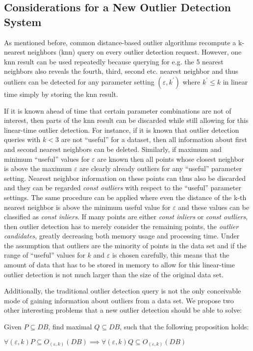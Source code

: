 \documentclass[runningheads]{llncs}
\begin{document}
\subsection{Considerations for a New Outlier Detection System}
As mentioned before, common distance-based outlier algorithms recompute a k-nearest neighbors (knn) query on every outlier detection request. However, one knn result can be used repeatedly because querying for e.g. the 5 nearest neighbors also reveals the fourth, third, second etc. nearest neighbor and thus outliers can be detected for any parameter setting $(\varepsilon,k^\prime)$ where $k^\prime \leq k$ in linear time simply by storing the knn result.

If it is known ahead of time that certain parameter combinations are not of interest, then parts of the knn result can be discarded while still allowing for this linear-time outlier detection. For instance, if it is known that outlier detection queries with $k < 3$ are not ``useful'' for a dataset, then all information about first and second nearest neighbors can be deleted. Similarly, if maximum and minimum ``useful'' values for $\varepsilon$ are known then all points whose closest neighbor is above the maximum $\varepsilon$ are clearly already outliers for any ``useful'' parameter setting. Nearest neighbor information on these points can thus also be discarded and they can be regarded \emph{const outliers} with respect to the ``useful'' parameter settings. The same procedure can be applied where even the distance of the k-th nearest neighbor is above the minimum useful value for $\varepsilon$ and these values can be classified as \emph{const inliers}. If many points are either \emph{const inliers} or \emph{const outliers}, then outlier detection has to merely consider the remaining points, the \emph{outlier candidates}, greatly decreasing both memory usage and processing time. Under the assumption that outliers are the minority of points in the data set and if the range of ``useful'' values for $k$ and $\varepsilon$ is chosen carefully, this means that the amount of data that has to be stored in memory to allow for this linear-time outlier detection is not much larger than the size of the original data set.

Additionally, the traditional outlier detection query is not the only conceivable mode of gaining information about outliers from a data set. We propose two other interesting problems that a new outlier detection should be able to solve:

\begin{definition}

\noindent Given $P\subseteq DB$, find maximal $Q\subseteq DB$, such that the following proposition holds:

\noindent $\forall (\varepsilon,k) P \subseteq O_{(\varepsilon, k)}(DB) \implies \forall (\varepsilon,k)Q\subseteq O_{(\varepsilon, k)}(DB)$
\end{definition}
\end{document}
